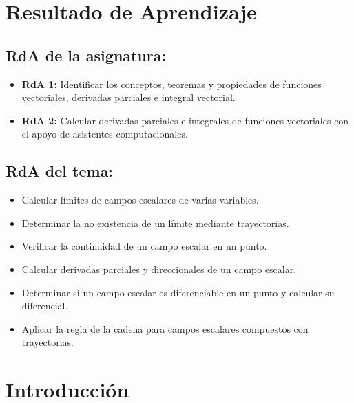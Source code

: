\documentclass[a4,11pt]{aleph-notas}
\begin{document}
\encabezado

\section*{Resultado de Aprendizaje}

\subsection*{RdA de la asignatura:}
\begin{itemize}[leftmargin=*]
    \item \textbf{RdA 1:} Identificar los conceptos, teoremas y propiedades de funciones vectoriales, derivadas parciales e integral vectorial.
    \item \textbf{RdA 2:} Calcular derivadas parciales e integrales de funciones vectoriales con el apoyo de asistentes computacionales.
\end{itemize}

\subsection*{RdA del tema:}
\begin{itemize}[leftmargin=*]
    \item Calcular límites de campos escalares de varias variables.
    \item Determinar la no existencia de un límite mediante trayectorias.
    \item Verificar la continuidad de un campo escalar en un punto.
    \item Calcular derivadas parciales y direccionales de un campo escalar.
    \item Determinar si un campo escalar es diferenciable en un punto y calcular su diferencial.
    \item Aplicar la regla de la cadena para campos escalares compuestos con trayectorias.
\end{itemize}

\section*{Introducción}
\end{document}

